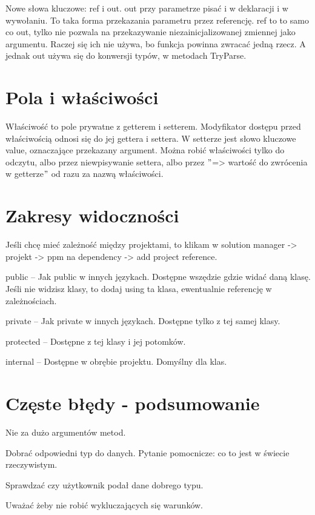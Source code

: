 \documentclass[10pt]{article}
\begin{document}
Nowe słowa kluczowe: ref i out.
out przy parametrze pisać i w deklaracji i w wywołaniu. To taka forma przekazania parametru przez referencję.
ref to to samo co out, tylko nie pozwala na przekazywanie niezainicjalizowanej zmiennej jako argumentu.
Raczej się ich nie używa, bo funkcja powinna zwracać jedną rzecz. A jednak out używa się do konwersji typów, w metodach TryParse.

\section{Pola i właściwości}
Właściwość to pole prywatne z getterem i setterem. Modyfikator dostępu przed właściwością odnosi się do jej gettera i settera. W setterze jest słowo kluczowe value, oznaczające przekazany argument. Można robić właściwości tylko do odczytu, albo przez niewpisywanie settera, albo przez $"$=> wartość do zwrócenia w getterze$"$ od razu za nazwą właściwości.

\section{Zakresy widoczności}
Jeśli chcę mieć zależność między projektami, to klikam w solution manager -> projekt -> ppm na dependency -> add project reference.

public -- Jak public w innych językach. Dostępne wszędzie gdzie widać daną klasę. Jeśli nie widzisz klasy, to dodaj using ta klasa, ewentualnie referencję w zależnościach.

private -- Jak private w innych językach. Dostępne tylko z tej samej klasy.

protected -- Dostępne z tej klasy i jej potomków.

internal -- Dostępne w obrębie projektu. Domyślny dla klas.

\section{Częste błędy - podsumowanie}
Nie za dużo argumentów metod.

Dobrać odpowiedni typ do danych. Pytanie pomocnicze: co to jest w świecie rzeczywistym.

Sprawdzać czy użytkownik podał dane dobrego typu.

Uważać żeby nie robić wykluczających się warunków.
\end{document}
